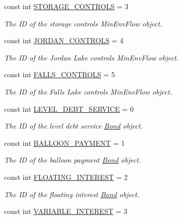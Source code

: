 \begin{DoxyCompactItemize}
const int \mbox{\hyperlink{classConstants_ae986af9edd51d442ce78589435ddbf0b}{S\+T\+O\+R\+A\+G\+E\+\_\+\+C\+O\+N\+T\+R\+O\+LS}} = 3
\begin{DoxyCompactList}\small\item\em The ID of the storage controls {\ttfamily Min\+Env\+Flow} object. \end{DoxyCompactList}\item 
const int \mbox{\hyperlink{classConstants_ae35241b436f7a539f367f08b0f9fa9f1}{J\+O\+R\+D\+A\+N\+\_\+\+C\+O\+N\+T\+R\+O\+LS}} = 4
\begin{DoxyCompactList}\small\item\em The ID of the Jordan Lake controls {\ttfamily Min\+Env\+Flow} object. \end{DoxyCompactList}\item 
const int \mbox{\hyperlink{classConstants_a9ced0b193590ae665ccefc280837464d}{F\+A\+L\+L\+S\+\_\+\+C\+O\+N\+T\+R\+O\+LS}} = 5
\begin{DoxyCompactList}\small\item\em The ID of the Falls Lake controls {\ttfamily Min\+Env\+Flow} object. \end{DoxyCompactList}\item 
const int \mbox{\hyperlink{classConstants_a4b19c9668b1dd7c3cf77b16029fe3cac}{L\+E\+V\+E\+L\+\_\+\+D\+E\+B\+T\+\_\+\+S\+E\+R\+V\+I\+CE}} = 0
\begin{DoxyCompactList}\small\item\em The ID of the level debt service \mbox{\hyperlink{classBond}{Bond}} object. \end{DoxyCompactList}\item 
const int \mbox{\hyperlink{classConstants_a08c9220e91237a5b58d648fb4298833c}{B\+A\+L\+L\+O\+O\+N\+\_\+\+P\+A\+Y\+M\+E\+NT}} = 1
\begin{DoxyCompactList}\small\item\em The ID of the balloon payment \mbox{\hyperlink{classBond}{Bond}} object. \end{DoxyCompactList}\item 
const int \mbox{\hyperlink{classConstants_aaa7f6235ee94070b06f049654312a63e}{F\+L\+O\+A\+T\+I\+N\+G\+\_\+\+I\+N\+T\+E\+R\+E\+ST}} = 2
\begin{DoxyCompactList}\small\item\em The ID of the floating interest \mbox{\hyperlink{classBond}{Bond}} object. \end{DoxyCompactList}\item 
const int \mbox{\hyperlink{classConstants_a690e2cbce0018eae1ccf94bd8e5bebdd}{V\+A\+R\+I\+A\+B\+L\+E\+\_\+\+I\+N\+T\+E\+R\+E\+ST}} = 3

\end{DoxyCompactItemize}
